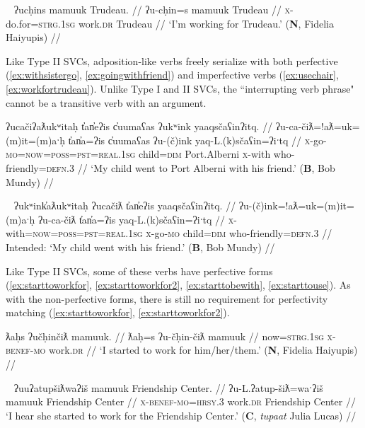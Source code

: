 \ex~ \label{ex:workfortrudeau}
\begingl
\glpreamble ʔucḥins mamuuk Trudeau. //
\gla ʔu-cḥin=s mamuuk Trudeau //
\glb \textsc{x}-do.for=\textsc{strg.1sg} work.\textsc{dr} Trudeau //
\glft `I'm working for Trudeau.' (\textbf{N}, Fidelia Haiyupis) //
\endgl
\xe

Like Type II SVCs, adposition-like verbs freely serialize with both perfective (\ref{ex:withsistergo}, \ref{ex:goingwithfriend}) and imperfective verbs (\ref{ex:usechair}, \ref{ex:workfortrudeau}). Unlike Type I and II SVCs, the ``interrupting verb phrase" cannot be a transitive verb with an argument.

\ex \label{ex:goingwithfriend}
\begingl
\glpreamble ʔucačiʔaƛukʷitaḥ t̓an̓eʔis c̓uumaʕas ʔukʷink yaaqsčaʕinʔitq. //
\gla ʔu-ca-čiƛ=!aƛ=uk=(m)it=(m)aˑḥ t̓an̓a=ʔis c̓uumaʕas ʔu-(č)ink yaq-L.(k)sčaʕin=ʔiˑtq //
\glb \textsc{x}-go-\textsc{mo}=\textsc{now}=\textsc{poss}=\textsc{pst}=\textsc{real.1sg} child=\textsc{dim} Port.Alberni \textsc{x}-with who-friendly=\textsc{defn.3} //
\glft `My child went to Port Alberni with his friend.' (\textbf{B}, Bob Mundy) //
\endgl
\xe

\ex~ \label{ex:*goingwithfriend}
\begingl
\glpreamble *ʔukʷink̓aƛukʷitaḥ ʔucačiƛ t̓an̓eʔis yaaqsčaʕinʔitq. //
\gla ʔu-(č)ink=!aƛ=uk=(m)it=(m)aˑḥ ʔu-ca-čiƛ t̓an̓a=ʔis yaq-L.(k)sčaʕin=ʔiˑtq //
\glb \textsc{x}-with=\textsc{now}=\textsc{poss}=\textsc{pst}=\textsc{real.1sg} \textsc{x}-go-\textsc{mo} child=\textsc{dim} who-friendly=\textsc{defn.3} //
\glft Intended: `My child went with his friend.' (\textbf{B}, Bob Mundy) //
\endgl
\xe


Like Type II SVCs, some of these verbs have perfective forms (\ref{ex:starttoworkfor}, \ref{ex:starttoworkfor2}, \ref{ex:starttobewith}, \ref{ex:starttouse}). As with the non-perfective forms, there is still no requirement for perfectivity matching (\ref{ex:starttoworkfor}, \ref{ex:starttoworkfor2}).

\ex \label{ex:starttoworkfor}
\begingl
\glpreamble ƛaḥs ʔučḥinčiƛ mamuuk. //
\gla ƛaḥ=s ʔu-čḥin-čiƛ mamuuk //
\glb now=\textsc{strg.1sg} \textsc{x}-\textsc{benef}-\textsc{mo} work.\textsc{dr} //
\glft `I started to work for him/her/them.' (\textbf{N}, Fidelia Haiyupis) //
\endgl
\xe

\ex~ \label{ex:starttoworkfor2}
\begingl
\glpreamble ʔuuʔatupšiƛwaʔiš mamuuk Friendship Center. //
\gla ʔu-L.ʔatup-šiƛ=waˑʔiš mamuuk Friendship Center //
\glb \textsc{x}-\textsc{benef}-\textsc{mo}=\textsc{hrsy.3} work.\textsc{dr} Friendship Center //
\glft `I hear she started to work for the Friendship Center.' (\textbf{C}, \textit{tupaat} Julia Lucas) //
\endgl
\xe

